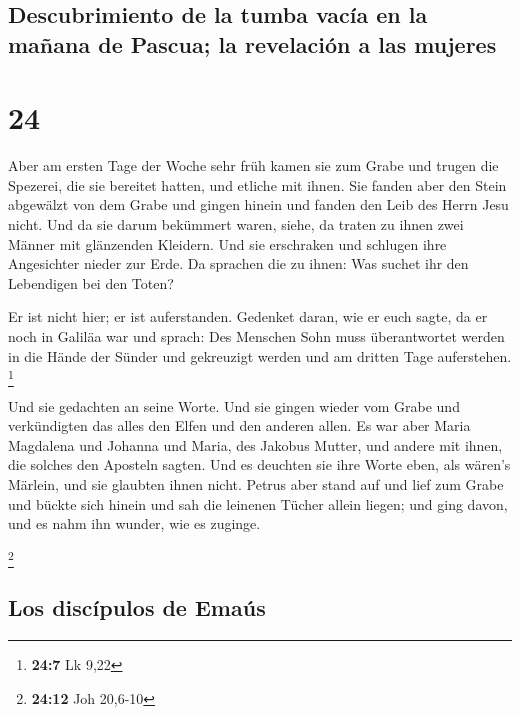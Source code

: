 \hypertarget{descubrimiento-de-la-tumba-vacuxeda-en-la-mauxf1ana-de-pascua-la-revelaciuxf3n-a-las-mujeres}{%
\subsection{Descubrimiento de la tumba vacía en la mañana de Pascua; la
revelación a las
mujeres}\label{descubrimiento-de-la-tumba-vacuxeda-en-la-mauxf1ana-de-pascua-la-revelaciuxf3n-a-las-mujeres}}

\hypertarget{section-23}{%
\section{24}\label{section-23}}

 Aber am ersten Tage der Woche sehr früh kamen sie zum
Grabe und trugen die Spezerei, die sie bereitet hatten, und etliche mit
ihnen.  Sie fanden aber den Stein abgewälzt von dem Grabe
 und gingen hinein und fanden den Leib des Herrn Jesu
nicht.  Und da sie darum bekümmert waren, siehe, da traten
zu ihnen zwei Männer mit glänzenden Kleidern.  Und sie
erschraken und schlugen ihre Angesichter nieder zur Erde. Da sprachen
die zu ihnen: Was suchet ihr den Lebendigen bei den Toten?

 Er ist nicht hier; er ist auferstanden. Gedenket daran,
wie er euch sagte, da er noch in Galiläa war  und sprach:
Des Menschen Sohn muss überantwortet werden in die Hände der Sünder und
gekreuzigt werden und am dritten Tage auferstehen. \footnote{\textbf{24:7}
  Lk 9,22}

 Und sie gedachten an seine Worte.  Und sie
gingen wieder vom Grabe und verkündigten das alles den Elfen und den
anderen allen.  Es war aber Maria Magdalena und Johanna
und Maria, des Jakobus Mutter, und andere mit ihnen, die solches den
Aposteln sagten.  Und es deuchten sie ihre Worte eben,
als wären's Märlein, und sie glaubten ihnen nicht. 
Petrus aber stand auf und lief zum Grabe und bückte sich hinein und sah
die leinenen Tücher allein liegen; und ging davon, und es nahm ihn
wunder, wie es zuginge.

\footnote{\textbf{24:12} Joh 20,6-10}

\hypertarget{los-discuxedpulos-de-emauxfas}{%
\subsection{Los discípulos de
Emaús}\label{los-discuxedpulos-de-emauxfas}}

